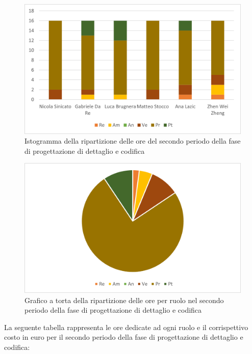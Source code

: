 \begin{figure}[H]
    \centering
    \includegraphics[scale=0.6]{img/grafi preventivo/istogrammi/codifica/periodo2.png}
    \caption{Istogramma della ripartizione delle ore del secondo periodo della fase di progettazione di dettaglio e codifica}
\end{figure}
\begin{figure}[H]
    \centering
    \includegraphics[scale=0.6]{img/grafi preventivo/torta/codifica/periodo2.png}
    \caption{Grafico a torta della ripartizione delle ore per ruolo nel secondo periodo della fase di progettazione di dettaglio e codifica}
\end{figure}
La seguente tabella rappresenta le ore dedicate ad ogni ruolo e il corrispettivo costo in euro per il secondo periodo della fase di progettazione di dettaglio e codifica:

